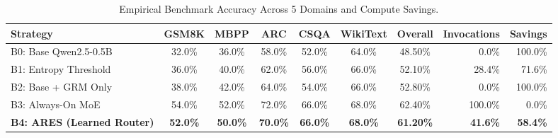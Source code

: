 \begin{table}[h]
\centering
\small
\caption{Empirical Benchmark Accuracy Across 5 Domains and Compute Savings.}
\label{tab:main_results}
\begin{tabular}{lccccccrr}
\toprule
\textbf{Strategy} & \textbf{GSM8K} & \textbf{MBPP} & \textbf{ARC} & \textbf{CSQA} & \textbf{WikiText} & \textbf{Overall} & \textbf{Invocations} & \textbf{Savings} \\
\midrule
B0: Base Qwen2.5-0.5B & 32.0\% & 36.0\% & 58.0\% & 52.0\% & 64.0\% & 48.50\% & 0.0\% & 100.0\% \\
B1: Entropy Threshold & 36.0\% & 40.0\% & 62.0\% & 56.0\% & 66.0\% & 52.10\% & 28.4\% & 71.6\% \\
B2: Base + GRM Only & 38.0\% & 42.0\% & 64.0\% & 54.0\% & 66.0\% & 52.80\% & 0.0\% & 100.0\% \\
B3: Always-On MoE & 54.0\% & 52.0\% & 72.0\% & 66.0\% & 68.0\% & 62.40\% & 100.0\% & 0.0\% \\
\textbf{B4: ARES (Learned Router)} & \textbf{52.0\%} & \textbf{50.0\%} & \textbf{70.0\%} & \textbf{66.0\%} & \textbf{68.0\%} & \textbf{61.20\%} & \textbf{41.6\%} & \textbf{58.4\%} \\
\bottomrule
\end{tabular}
\end{table}
